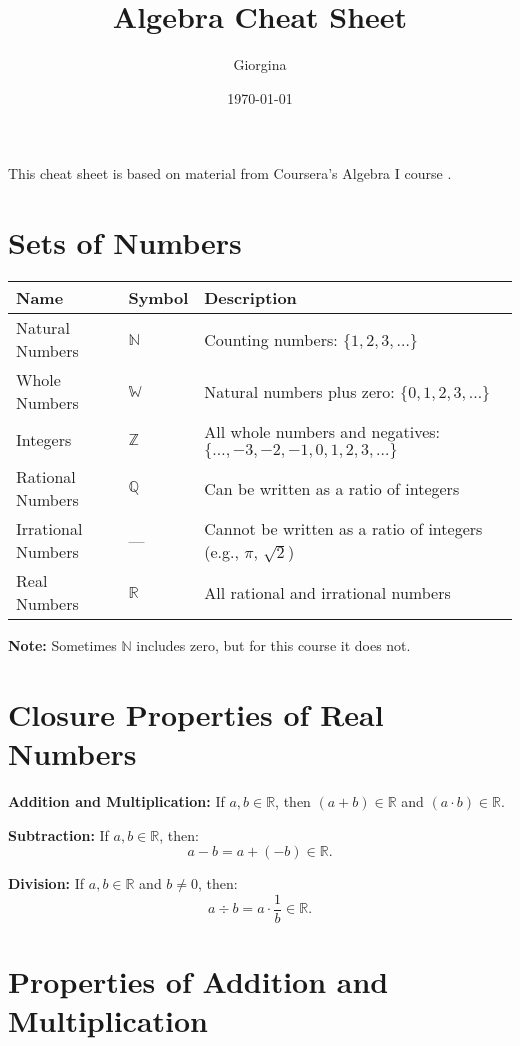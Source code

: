\documentclass[12pt]{article}
\title{Algebra Cheat Sheet}
\author{Giorgina}
\date{\today}
\begin{document}
\maketitle

This cheat sheet is based on material from Coursera's Algebra I course \cite{coursera-algebra-i}.


\section*{Sets of Numbers}

\begin{tabular}{|l|l|p{8cm}|}
\hline
\textbf{Name} & \textbf{Symbol} & \textbf{Description} \\
\hline
Natural Numbers & $\mathbb{N}$ & Counting numbers: $\{1, 2, 3, \dots\}$ \\
Whole Numbers & $\mathbb{W}$ & Natural numbers plus zero: $\{0, 1, 2, 3, \dots\}$ \\
Integers & $\mathbb{Z}$ & All whole numbers and negatives: $\{\dots, -3, -2, -1, 0, 1, 2, 3, \dots\}$ \\
Rational Numbers & $\mathbb{Q}$ & Can be written as a ratio of integers \\
Irrational Numbers & --- & Cannot be written as a ratio of integers (e.g., $\pi$, $\sqrt{2}$) \\
Real Numbers & $\mathbb{R}$ & All rational and irrational numbers \\
\hline
\end{tabular}

\vspace{1em}
\textbf{Note:} Sometimes $\mathbb{N}$ includes zero, but for this course it does not.

\section*{Closure Properties of Real Numbers}

\textbf{Addition and Multiplication:} If $a, b \in \mathbb{R}$, then $(a + b) \in \mathbb{R}$ and $(a \cdot b) \in \mathbb{R}$.

\textbf{Subtraction:} If $a, b \in \mathbb{R}$, then:
\[
a - b = a + (-b) \in \mathbb{R}.
\]

\textbf{Division:} If $a, b \in \mathbb{R}$ and $b \neq 0$, then:
\[
a \div b = a \cdot \frac{1}{b} \in \mathbb{R}.
\]

\section*{Properties of Addition and Multiplication}
\end{document}
